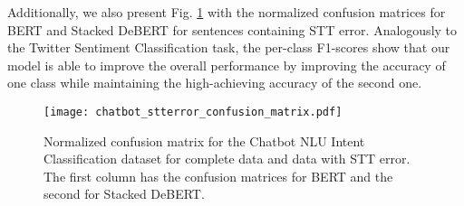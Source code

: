 \documentclass[review]{elsarticle}
\begin{document}
  \begin{table}[ht!]
   \caption{F1-micro scores for the Chatbot Intent Classification Corpus. Note that we include results with the original sentences (complete data) and sentences imbued with TTS-STT error (\textit{gtts-witai} and \textit{macsay-witai}), with the noise level being represented by the iBLEU and WER scores.}
   \label{tbl:chatbot_missing_words_f1}
   \bigskip
   \centering
 \end{table}

Additionally, we also present Fig. \ref{fig:chatbot_stterror_confusion_matrix} with the normalized confusion matrices for BERT and Stacked DeBERT for sentences containing STT error. Analogously to the Twitter Sentiment Classification task, the per-class F1-scores show that our model is able to improve the overall performance by improving the accuracy of one class while maintaining the high-achieving accuracy of the second one.

\begin{figure}[ht!]
   \centering
       \texttt{[image: chatbot\_stterror\_confusion\_matrix.pdf]}
   \caption{Normalized confusion matrix for the Chatbot NLU Intent Classification dataset for complete data and data with STT error. The first column has the confusion matrices for BERT and the second for Stacked DeBERT.}
   \label{fig:chatbot_stterror_confusion_matrix}
\end{figure}
\end{document}
